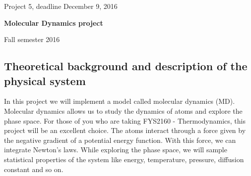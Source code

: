 \documentclass[%
oneside,                 %
final,                   %
10pt]{article}
\begin{document}

\newcommand{\exercisesection}[1]{\subsection*{#1}}






\thispagestyle{empty}

\begin{center}
{\LARGE\bf
\begin{spacing}{1.25}
Project 5, deadline  December 9, 2016
\end{spacing}
}
\end{center}


\begin{center}
{\bf Molecular Dynamics project${}^{}$} \\ [0mm]
\end{center}

\begin{center}
\end{center}
    

\begin{center}
Fall semester 2016
\end{center}

\vspace{1cm}


\subsection*{Theoretical background and description of the physical system}
In this project we will implement a model called molecular dynamics (MD). Molecular dynamics allows us to study the dynamics of atoms and explore the phase space. For those of you who are taking FYS2160 - Thermodynamics, this project will be an excellent choice. The atoms interact through a force given by the negative gradient of a potential energy function. With this force, we can integrate Newton's laws. While exploring the phase space, we will sample statistical properties of the system like energy, temperature, pressure, diffusion constant and so on.
\end{document}
